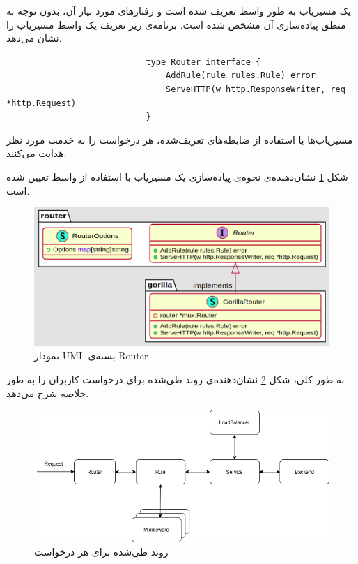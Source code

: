 یک مسیریاب به طور واسط تعریف شده‌ است و رفتار‌های مورد نیاز آن، بدون توجه به منطق پیاده‌سازی آن مشخص شده است. برنامه‌ی زیر تعریف یک واسط مسیریاب را نشان می‌دهد.

\cleardoublepage

\begin{latin}
    \begin{lstlisting}
                            type Router interface {
                                AddRule(rule rules.Rule) error
                                ServeHTTP(w http.ResponseWriter, req *http.Request)
                            }
    \end{lstlisting}
\end{latin}

مسیریاب‌ها با استفاده از ضابطه‌های تعریف‌شده، هر درخواست را به خدمت مورد نظر هدایت می‌کنند.

شکل
\ref{router_package}
نشان‌دهنده‌ی نحوه‌ی پیاده‌سازی یک مسیریاب با استفاده ‌از واسط تعیین شده است.

\begin{figure}[H]
    \centering
    \label{router_package}
    \includegraphics[scale=0.2]{images/Router.png}
    \caption{نمودار UML بسته‌ی Router}
\end{figure}

به طور کلی، شکل
\ref{flow}
نشان‌دهنده‌ی روند طی‌شده برای درخواست کاربران را به طور خلاصه شرح می‌دهد.

\begin{figure}[H]
    \centering
    \label{flow}
    \includegraphics[scale=0.4]{images/Flow.png}
    \caption{روند طی‌شده برای هر درخواست}
\end{figure}


